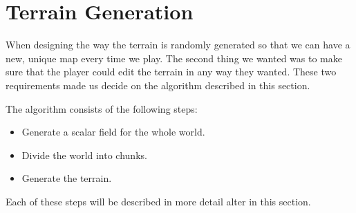 \section*{Terrain Generation}
When designing the way the terrain is randomly generated so that we can have a new, unique map every time we play.
The second thing we wanted was to make sure that the player could edit the terrain in any way they wanted.
These two requirements made us decide on the algorithm described in this section.

The algorithm consists of the following steps:
\begin{itemize}
    \item Generate a scalar field for the whole world.
    \item Divide the world into chunks.
    \item Generate the terrain.
\end{itemize}

Each of these steps will be described in more detail alter in this section.




